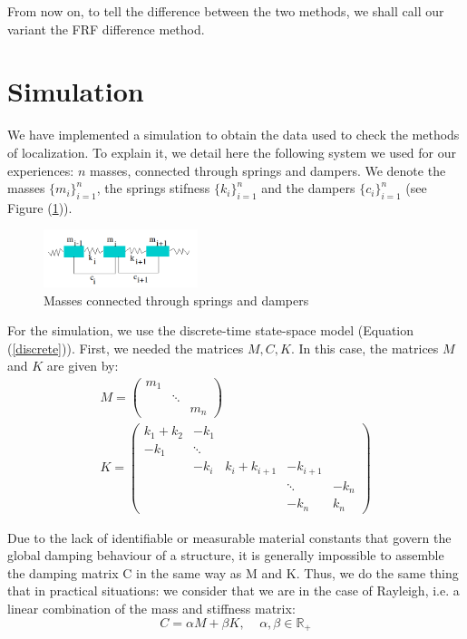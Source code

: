 \documentclass[journal]{IEEEtran}
\begin{document}
From now on, to tell the difference between the two methods, we shall call our variant the FRF difference method.



\section{Simulation}


We have implemented a simulation to obtain the data used to check the methods of localization. To explain it, we detail here the following system we used for our experiences: $n$ masses, connected
through springs and dampers. We denote the masses $\{m_i\}_{i=1}^n$, the springs stifness $\{k_i\}_{i=1}^n$ and the dampers $\{c_i\}_{i=1}^n$ (see Figure (\ref{springs})).

\begin{figure}[h!]
  \centering
  \includegraphics[width=0.4\textwidth]{images/ressorts.png}
  \caption{Masses connected through springs and dampers}
  \label{springs}
\end{figure}

For the simulation, we use the discrete-time state-space model (Equation (\ref{discrete})). First, we needed the matrices $M, C, K$. In this case, the matrices $M$ and $K$ are given by:
\begin{equation}
\begin{array}{l}
M =
\begin{pmatrix}
m_1\\
&\ddots\\
&&m_n
\end{pmatrix}
\\
K =
\begin{pmatrix}
k_1 + k_2 & - k_1 \\
- k_1 &\ddots\\
& -k_i & k_i + k_{i+1} & -k_{i+1} \\
&&&\ddots& -k_n\\
&&& -k_n & k_n
\end{pmatrix}
\end{array}
\end{equation}


Due to the lack of identifiable or measurable material
constants that govern the global damping behaviour of a structure, it is generally
impossible to assemble the damping matrix C in the same way as M and K.
Thus, we do the same thing that in practical situations: we consider that we are in the case of Rayleigh, i.e. a linear combination of the mass and stiffness matrix:
\begin{equation}
C = \alpha M + \beta K,\ \ \ \ \ \alpha, \beta \in \mathbb{R}_+
\end{equation}
\end{document}
